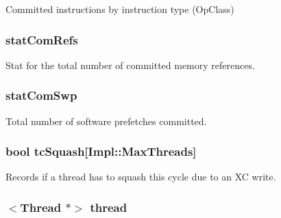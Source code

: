 \label{classDefaultCommit_ad0d59ba553bc001d75aff706903e2f77}
Committed instructions by instruction type (OpClass) \hypertarget{classDefaultCommit_afe174c4b8e70d840a2e91bf1ca3092ac}{
\subsubsection[{statComRefs}]{ {\bf statComRefs}}}
\label{classDefaultCommit_afe174c4b8e70d840a2e91bf1ca3092ac}
Stat for the total number of committed memory references. \hypertarget{classDefaultCommit_a4cb385aa97530dd2621c74f376839e79}{
\subsubsection[{statComSwp}]{ {\bf statComSwp}}}
\label{classDefaultCommit_a4cb385aa97530dd2621c74f376839e79}
Total number of software prefetches committed. \hypertarget{classDefaultCommit_a4fce523b7a931003efb9665605a87ca0}{
\subsubsection[{tcSquash}]{\setlength{\rightskip}{0pt plus 5cm}bool {\bf tcSquash}\mbox{[}Impl::MaxThreads\mbox{]}}}
\label{classDefaultCommit_a4fce523b7a931003efb9665605a87ca0}
Records if a thread has to squash this cycle due to an XC write. \hypertarget{classDefaultCommit_afe9da004c5a3f37cbb72fa3763d4c0d1}{
\subsubsection[{thread}]{$<${\bf Thread} $\ast$$>$ {\bf thread}}}

